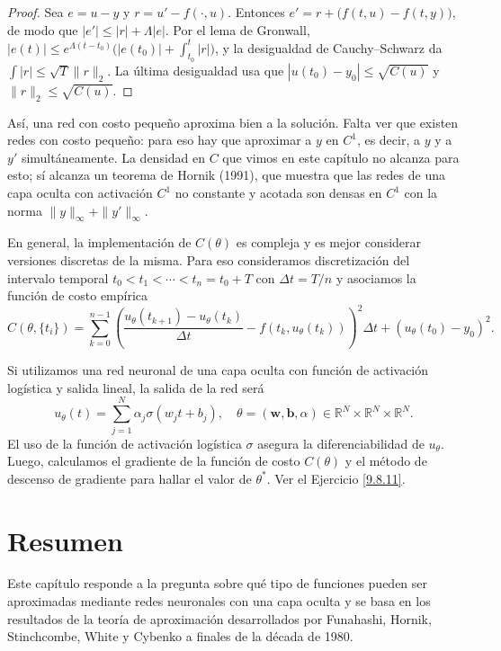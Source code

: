 \documentclass[12pt, a4paper]{amsbook}
\newcommand{\R}{{\mathbb R}}
\newcommand{\ww}{{\mathbf w}}
\newcommand{\bb}{{\mathbf b}}
\theoremstyle{remark}
\theoremstyle{definition}
\numberwithin{section}{chapter}
\numberwithin{subsection}{section}
\numberwithin{equation}{section}
\numberwithin{figure}{chapter}
\begin{document}
\begin{proof}
Sea $e=u-y$ y $r=u'-f(\cdot,u)$. Entonces $e'=r+\big(f(t,u)-f(t,y)\big)$, de modo que $|e'|\le|r|+\Lambda|e|$. Por el lema de Gronwall, $|e(t)|\le e^{\Lambda(t-t_0)}\big(|e(t_0)|+\int_{t_0}^t|r|\big)$, y la desigualdad de Cauchy--Schwarz da $\int|r|\le\sqrt T\|r\|_2$. La última desigualdad usa que $|u(t_0)-y_0|\le\sqrt{C(u)}$ y $\|r\|_2\le\sqrt{C(u)}$.
\end{proof}

Así, una red con costo pequeño aproxima bien a la solución. Falta ver que existen redes con costo pequeño: para eso hay que aproximar a $y$ en $C^1$, es decir, a $y$ y a $y'$ simultáneamente. La densidad en $C$ que vimos en este capítulo no alcanza para esto; sí alcanza un teorema de Hornik (1991), que muestra que las redes de una capa oculta con activación $C^1$ no constante y acotada son densas en $C^1$ con la norma $\|y\|_\infty+\|y'\|_\infty$.

En general, la implementación de $C(\theta)$ es compleja y es mejor considerar versiones discretas de la misma. Para eso consideramos discretización del intervalo temporal $t_0<t_1<\cdots<t_n = t_0+T$ con $\Delta t=T/n$ y asociamos la función de costo empírica
$$
C(\theta, \{t_i\}) = \sum_{k=0}^{n-1} \left(\frac{u_\theta(t_{k+1}) - u_\theta(t_k)}{\Delta t} - f(t_k, u_\theta(t_k))\right)^2 \Delta t +(u_\theta(t_0) - y_0)^2.
$$

Si utilizamos una red neuronal de una capa oculta con función de activación logística y salida lineal, la salida de la red será
\begin{equation}\label{966}
u_\theta(t) = \sum_{j=1}^N \alpha_j \sigma(w_j t + b_j),\quad \theta = (\ww, \bb, \alpha)\in \R^N\times\R^N\times\R^N.
\end{equation}
El uso de la función de activación logística $\sigma$ asegura la diferenciabilidad de $u_\theta$. Luego, calculamos el gradiente de la función de costo $C(\theta)$ y el método de descenso de gradiente para  hallar el valor de $\theta^*$. Ver el Ejercicio \ref{9.8.11}.

\section{Resumen}\label{sec.c9.5}

Este capítulo responde a la pregunta sobre qué tipo de funciones pueden ser aproximadas mediante redes neuronales con una capa oculta y se basa en los resultados de la teoría de aproximación desarrollados por Funahashi, Hornik, Stinchcombe, White y Cybenko a finales de la década de 1980.
\end{document}
